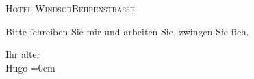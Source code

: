 \pstart
           \centering{}\textsc{Hotel Windsor\hspace*{1em}Behrenstrasse}.\pend
           
\pstart
           Bitte ſchreiben Sie mir und arbeiten Sie, zwingen Sie{ }ſich.\pend
           
\pstart
           Ihr alter{\\[\baselineskip]}\spacefill\mbox{Hugo}\pend
           \leftskip=0em{}\endnumbering{}  \newcommand{\dateiname}{L00907}\newcommand{\titel}{Hugo von Hofmannsthal an Arthur Schnitzler, [20. 3. 1899]}\newcommand{\editorInnen}{Martin Anton Müller und Gerd-Hermann Susen}
